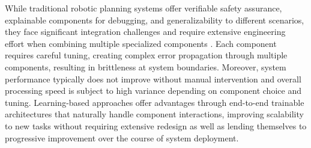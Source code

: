 While traditional robotic planning systems offer verifiable safety assurance, explainable components for debugging, and generalizability to different scenarios, they face significant integration challenges and require extensive engineering effort when combining multiple specialized components \cite{abderezaei2024clutter}. Each component requires careful tuning, creating complex error propagation through multiple components, resulting in brittleness at system boundaries. Moreover, system performance typically does not improve without manual intervention and overall processing speed is subject to high variance depending on component choice and tuning.
Learning-based approaches offer advantages through end-to-end trainable architectures that naturally handle component interactions, improving scalability to new tasks without requiring extensive redesign as well as lending themselves to progressive improvement over the course of system deployment.







